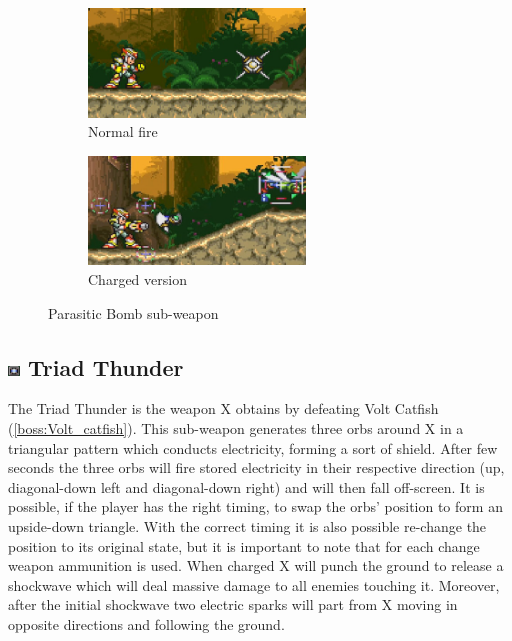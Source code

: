 \begin{figure}[htp]
	\centering
	\begin{subfigure}{.49\linewidth}
		\centering
		\includegraphics[height=2.9cm]{figures/X3/weapons/P_bomb.png}
		\caption{Normal fire}	
	\end{subfigure}
	\begin{subfigure}{.49\linewidth}
		\centering
		\includegraphics[height=2.9cm]{figures/X3/weapons/P_bomb_C.jpg}
		\caption{Charged version}	
	\end{subfigure}
	\caption{Parasitic Bomb sub-weapon}
\end{figure}


\subsection{\includegraphics[width=12px, height=10px]{figures/X3/weapons/T_thunder.jpg} Triad Thunder}\label{Triad_Thunder}

The Triad Thunder is the weapon X obtains by defeating Volt Catfish (\ref{boss:Volt_catfish}). This sub-weapon generates three orbs around X in a triangular pattern which conducts electricity, forming a sort of shield. After few seconds the three orbs will fire stored electricity in their respective direction (up, diagonal-down left and diagonal-down right) and will then fall off-screen. It is possible, if the player has the right timing, to swap the orbs' position to form an upside-down triangle. With the correct timing it is also possible re-change the position to its original state, but it is important to note that for each change weapon ammunition is used. When charged X will punch the ground to release a shockwave which will deal massive damage to all enemies touching it. Moreover, after the initial shockwave two electric sparks will part from X moving in opposite directions and following the ground.

